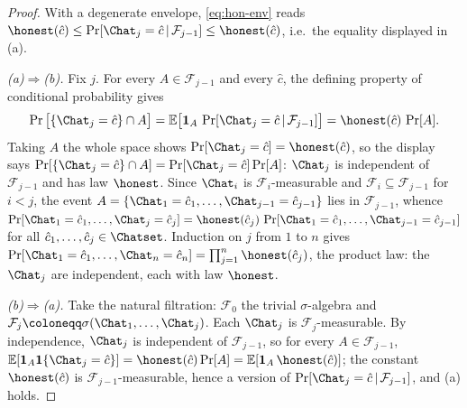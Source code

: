 \begin{proof}
With a degenerate envelope, \eqref{eq:hon-env} reads
$\honest(\hat c)\le\Pr[\Chat_j=\hat c\,|\,\mathcal{F}_{j-1}]\le\honest(\hat
c)$, i.e.\ the equality displayed in (a).

\emph{(a)$\Rightarrow$(b).} Fix $j$. For every $A\in\mathcal{F}_{j-1}$ and
every $\hat c$, the defining property of conditional probability gives
\begin{equation*}
  \Pr\big[\{\Chat_j=\hat c\}\cap A\big]
  =\mathbb{E}\big[\mathbf{1}_A\,\Pr[\Chat_j=\hat c\,|\,\mathcal{F}_{j-1}]\big]
  =\honest(\hat c)\,\Pr[A].
\end{equation*}
Taking $A$ the whole space shows $\Pr[\Chat_j=\hat c]=\honest(\hat c)$, so
the display says $\Pr[\{\Chat_j=\hat c\}\cap A]=\Pr[\Chat_j=\hat c]\Pr[A]$:
$\Chat_j$ is independent of $\mathcal{F}_{j-1}$ and has law $\honest$. Since
$\Chat_i$ is $\mathcal{F}_i$-measurable and $\mathcal{F}_i\subseteq
\mathcal{F}_{j-1}$ for $i<j$, the event
$A=\{\Chat_1=\hat c_1,\dots,\Chat_{j-1}=\hat c_{j-1}\}$ lies in
$\mathcal{F}_{j-1}$, whence
$\Pr[\Chat_1=\hat c_1,\dots,\Chat_j=\hat c_j]
=\honest(\hat c_j)\,\Pr[\Chat_1=\hat c_1,\dots,\Chat_{j-1}=\hat c_{j-1}]$
for all $\hat c_1,\dots,\hat c_j\in\Chatset$. Induction on $j$ from $1$ to $n$
gives $\Pr[\Chat_1=\hat c_1,\dots,\Chat_n=\hat c_n]=\prod_{j=1}^{n}\honest(\hat
c_j)$, the product law: the $\Chat_j$ are independent, each with law
$\honest$.

\emph{(b)$\Rightarrow$(a).} Take the natural filtration: $\mathcal{F}_0$ the
trivial $\sigma$-algebra and $\mathcal{F}_j\coloneqq\sigma(\Chat_1,\dots,
\Chat_j)$. Each $\Chat_j$ is $\mathcal{F}_j$-measurable. By independence,
$\Chat_j$ is independent of $\mathcal{F}_{j-1}$, so for every
$A\in\mathcal{F}_{j-1}$,
$\mathbb{E}[\mathbf{1}_A\mathbf{1}\{\Chat_j=\hat c\}]=\honest(\hat c)\Pr[A]
=\mathbb{E}[\mathbf{1}_A\,\honest(\hat c)]$; the constant $\honest(\hat c)$
is $\mathcal{F}_{j-1}$-measurable, hence a version of
$\Pr[\Chat_j=\hat c\,|\,\mathcal{F}_{j-1}]$, and (a) holds.
\end{proof}
